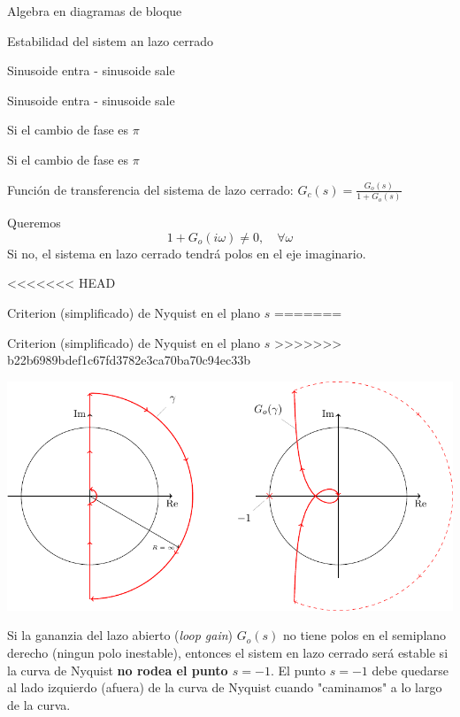 \documentclass[presentation,aspectratio=169]{beamer}
\begin{document}
\begin{frame}[label={sec:org8e8e439}]{Algebra en diagramas de bloque}
\begin{frame}[label={sec:org5218f19}]{Estabilidad del sistem an lazo cerrado}
\begin{frame}[label={sec:org4ce2307}]{Sinusoide entra - sinusoide sale}
\begin{frame}[label={sec:orgc598966}]{Sinusoide entra - sinusoide sale}
\begin{frame}[label={sec:orgbd54147}]{Si el cambio de fase es \(\pi\)}
\begin{frame}[label={sec:org80decbd}]{Si el cambio de fase es \(\pi\)}
\begin{center}
\end{center}
Función de transferencia del sistema de lazo cerrado: \(G_c(s) = \frac{G_o(s)}{1 + G_o(s)}\)
\begin{tcolorbox}
Queremos \[ 1 + G_o(i\omega) \neq 0, \quad \forall \omega \]
Si no, el sistema en lazo cerrado tendrá polos en el eje imaginario. 
\end{tcolorbox}
\end{frame}

<<<<<<< HEAD
\begin{frame}[label={sec:orgf06388b}]{Criterion (simplificado) de Nyquist en el plano \(s\)}
=======
\begin{frame}[label={sec:org790cc02}]{Criterion (simplificado) de Nyquist en el plano \(s\)}
>>>>>>> b22b6989bdef1c67fd3782e3ca70ba70c94ec33b
\begin{center}
\includegraphics[width=0.65\linewidth]{../../figures/implane-nyquist-contour-map}
\end{center}
\begin{tcolorbox}
Si la gananzia del lazo abierto (\textit{loop gain}) $G_o(s)$ no tiene polos en el semiplano derecho (ningun polo inestable), entonces el sistem en lazo cerrado será estable si la curva de Nyquist \textbf{no rodea el punto \(s=-1\)}. El punto $s=-1$ debe quedarse al lado izquierdo (afuera) de la curva de Nyquist cuando "caminamos" a lo largo de la curva.
\end{tcolorbox}
\end{frame}


\end{frame}
\end{frame}
\end{frame}
\end{frame}
\end{frame}
\end{frame}
\end{document}
